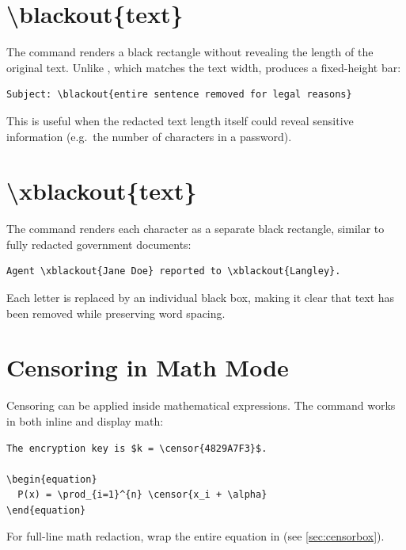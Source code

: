 \section{\textbackslash blackout\{text\}}

The  command renders a black rectangle without revealing the
length of the original text.  Unlike , which matches the text
width,  produces a fixed-height bar:

\begin{verbatim}
Subject: \blackout{entire sentence removed for legal reasons}
\end{verbatim}

This is useful when the redacted text length itself could reveal
sensitive information (e.g.\ the number of characters in a password).

\section{\textbackslash xblackout\{text\}}

The  command renders each character as a separate black
rectangle, similar to fully redacted government documents:

\begin{verbatim}
Agent \xblackout{Jane Doe} reported to \xblackout{Langley}.
\end{verbatim}

Each letter is replaced by an individual black box, making it clear that
text has been removed while preserving word spacing.

\section{Censoring in Math Mode}

Censoring can be applied inside mathematical expressions.  The
 command works in both inline and display math:

\begin{verbatim}
The encryption key is $k = \censor{4829A7F3}$.

\begin{equation}
  P(x) = \prod_{i=1}^{n} \censor{x_i + \alpha}
\end{equation}
\end{verbatim}

For full-line math redaction, wrap the entire equation in 
(see \cref{sec:censorbox}).

